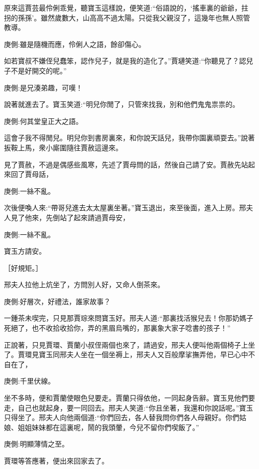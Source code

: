\begin{parag}
    原來這賈芸最伶俐乖覺，聽寶玉這樣說，便笑道:“俗語說的，‘搖車裏的爺爺，拄拐的孫孫’。雖然歲數大，山高高不過太陽。只從我父親沒了，這幾年也無人照管教導。\begin{note}庚側:雖是隨機而應，伶俐人之語，餘卻傷心。\end{note}如若寶叔不嫌侄兒蠢笨，認作兒子，就是我的造化了。”賈璉笑道:“你聽見了？認兒子不是好開交的呢。”\begin{note}庚側:是兄湊弟趣，可嘆！\end{note}說著就進去了。寶玉笑道:“明兒你閒了，只管來找我，別和他們鬼鬼祟祟的。\begin{note}庚側:何其堂皇正大之語。\end{note}這會子我不得閒兒。明兒你到書房裏來，和你說天話兒，我帶你園裏頑耍去。”說著扳鞍上馬，衆小廝圍隨往賈赦這邊來。
\end{parag}


\begin{parag}
    見了賈赦，不過是偶感些風寒，先述了賈母問的話，然後自己請了安。賈赦先站起來回了賈母話，\begin{note}庚側:一絲不亂。\end{note}次後便喚人來:“帶哥兒進去太太屋裏坐著。”寶玉退出，來至後面，進入上房。邢夫人見了他來，先倒站了起來請過賈母安，\begin{note}庚側:一絲不亂。\end{note}寶玉方請安。\begin{note}［好規矩。］\end{note}邢夫人拉他上炕坐了，方問別人好，又命人倒茶來。\begin{note}庚側:好層次，好禮法，誰家故事？\end{note}一鍾茶未喫完，只見那賈琮來問寶玉好。邢夫人道:“那裏找活猴兒去！你那奶媽子死絕了，也不收拾收拾你，弄的黑眉烏嘴的，那裏象大家子唸書的孩子！”
\end{parag}


\begin{parag}
    正說著，只見賈環、賈蘭小叔侄兩個也來了，請過安，邢夫人便叫他兩個椅子上坐了。賈環見寶玉同邢夫人坐在一個坐褥上，邢夫人又百般摩挲撫弄他，早已心中不自在了，\begin{note}庚側:千里伏線。\end{note}坐不多時，便和賈蘭使眼色兒要走。賈蘭只得依他，一同起身告辭。寶玉見他們要走，自己也就起身，要一同回去。邢夫人笑道:“你且坐著，我還和你說話呢。”寶玉只得坐了。邢夫人向他兩個道:“你們回去，各人替我問你們各人母親好。你們姑娘、姐姐妹妹都在這裏呢，鬧的我頭暈，今兒不留你們喫飯了。”\begin{note}庚側:明顯薄情之至。\end{note}賈環等答應著，便出來回家去了。
\end{parag}


